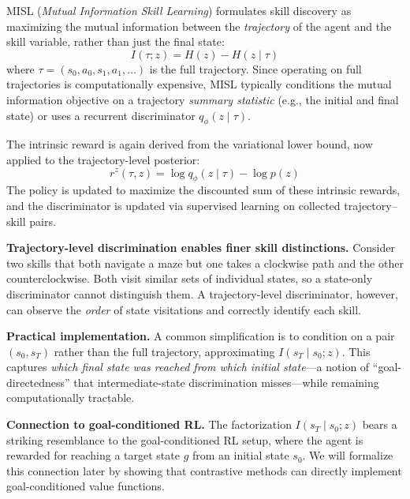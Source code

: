 \documentclass[11pt, letterpaper]{article}
\begin{document}
\begin{concept}
    MISL (\textit{Mutual Information Skill Learning}) formulates skill discovery as maximizing the mutual information between the \textit{trajectory} of the agent and the skill variable, rather than just the final state:
    \[
        I(\tau; z) = H(z) - H(z \mid \tau)
    \]
    where \(\tau = (s_0, a_0, s_1, a_1, \dots)\) is the full trajectory. Since operating on full trajectories is computationally expensive, MISL typically conditions the mutual information objective on a trajectory \textit{summary statistic} (e.g., the initial and final state) or uses a recurrent discriminator \(q_\phi(z \mid \tau)\).
 
    The intrinsic reward is again derived from the variational lower bound, now applied to the trajectory-level posterior:
    \[
        r^z(\tau, z) = \log q_\phi(z \mid \tau) - \log p(z)
    \]
    The policy is updated to maximize the discounted sum of these intrinsic rewards, and the discriminator is updated via supervised learning on collected trajectory--skill pairs.
\end{concept}
 
\begin{remark}
    \textbf{Trajectory-level discrimination enables finer skill distinctions.} Consider two skills that both navigate a maze but one takes a clockwise path and the other counterclockwise. Both visit similar sets of individual states, so a state-only discriminator cannot distinguish them. A trajectory-level discriminator, however, can observe the \textit{order} of state visitations and correctly identify each skill.
 
    \textbf{Practical implementation.} A common simplification is to condition on a pair \((s_0, s_T)\) rather than the full trajectory, approximating \(I(s_T \mid s_0; z)\). This captures \textit{which final state was reached from which initial state}---a notion of ``goal-directedness'' that intermediate-state discrimination misses---while remaining computationally tractable.
 
    \textbf{Connection to goal-conditioned RL.} The factorization \(I(s_T \mid s_0; z)\) bears a striking resemblance to the goal-conditioned RL setup, where the agent is rewarded for reaching a target state \(g\) from an initial state \(s_0\). We will formalize this connection later by showing that contrastive methods can directly implement goal-conditioned value functions.
\end{remark}
 
\end{document}
